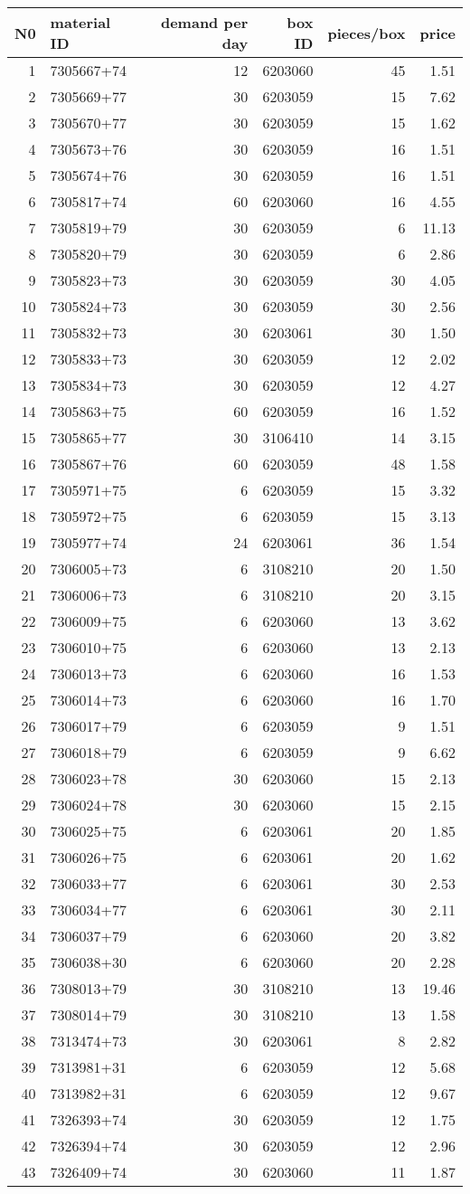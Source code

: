 \documentclass[
]{article}
\begin{document}
\begin{longtable}[]{@{}rlrrrr@{}}
\toprule
N0 & material ID & demand per day & box ID & pieces/box &
price\tabularnewline
\midrule
\endhead
1 & 7305667+74 & 12 & 6203060 & 45 & 1.51\tabularnewline
2 & 7305669+77 & 30 & 6203059 & 15 & 7.62\tabularnewline
3 & 7305670+77 & 30 & 6203059 & 15 & 1.62\tabularnewline
4 & 7305673+76 & 30 & 6203059 & 16 & 1.51\tabularnewline
5 & 7305674+76 & 30 & 6203059 & 16 & 1.51\tabularnewline
6 & 7305817+74 & 60 & 6203060 & 16 & 4.55\tabularnewline
7 & 7305819+79 & 30 & 6203059 & 6 & 11.13\tabularnewline
8 & 7305820+79 & 30 & 6203059 & 6 & 2.86\tabularnewline
9 & 7305823+73 & 30 & 6203059 & 30 & 4.05\tabularnewline
10 & 7305824+73 & 30 & 6203059 & 30 & 2.56\tabularnewline
11 & 7305832+73 & 30 & 6203061 & 30 & 1.50\tabularnewline
12 & 7305833+73 & 30 & 6203059 & 12 & 2.02\tabularnewline
13 & 7305834+73 & 30 & 6203059 & 12 & 4.27\tabularnewline
14 & 7305863+75 & 60 & 6203059 & 16 & 1.52\tabularnewline
15 & 7305865+77 & 30 & 3106410 & 14 & 3.15\tabularnewline
16 & 7305867+76 & 60 & 6203059 & 48 & 1.58\tabularnewline
17 & 7305971+75 & 6 & 6203059 & 15 & 3.32\tabularnewline
18 & 7305972+75 & 6 & 6203059 & 15 & 3.13\tabularnewline
19 & 7305977+74 & 24 & 6203061 & 36 & 1.54\tabularnewline
20 & 7306005+73 & 6 & 3108210 & 20 & 1.50\tabularnewline
21 & 7306006+73 & 6 & 3108210 & 20 & 3.15\tabularnewline
22 & 7306009+75 & 6 & 6203060 & 13 & 3.62\tabularnewline
23 & 7306010+75 & 6 & 6203060 & 13 & 2.13\tabularnewline
24 & 7306013+73 & 6 & 6203060 & 16 & 1.53\tabularnewline
25 & 7306014+73 & 6 & 6203060 & 16 & 1.70\tabularnewline
26 & 7306017+79 & 6 & 6203059 & 9 & 1.51\tabularnewline
27 & 7306018+79 & 6 & 6203059 & 9 & 6.62\tabularnewline
28 & 7306023+78 & 30 & 6203060 & 15 & 2.13\tabularnewline
29 & 7306024+78 & 30 & 6203060 & 15 & 2.15\tabularnewline
30 & 7306025+75 & 6 & 6203061 & 20 & 1.85\tabularnewline
31 & 7306026+75 & 6 & 6203061 & 20 & 1.62\tabularnewline
32 & 7306033+77 & 6 & 6203061 & 30 & 2.53\tabularnewline
33 & 7306034+77 & 6 & 6203061 & 30 & 2.11\tabularnewline
34 & 7306037+79 & 6 & 6203060 & 20 & 3.82\tabularnewline
35 & 7306038+30 & 6 & 6203060 & 20 & 2.28\tabularnewline
36 & 7308013+79 & 30 & 3108210 & 13 & 19.46\tabularnewline
37 & 7308014+79 & 30 & 3108210 & 13 & 1.58\tabularnewline
38 & 7313474+73 & 30 & 6203061 & 8 & 2.82\tabularnewline
39 & 7313981+31 & 6 & 6203059 & 12 & 5.68\tabularnewline
40 & 7313982+31 & 6 & 6203059 & 12 & 9.67\tabularnewline
41 & 7326393+74 & 30 & 6203059 & 12 & 1.75\tabularnewline
42 & 7326394+74 & 30 & 6203059 & 12 & 2.96\tabularnewline
43 & 7326409+74 & 30 & 6203060 & 11 & 1.87\tabularnewline

\end{longtable}
\end{document}
